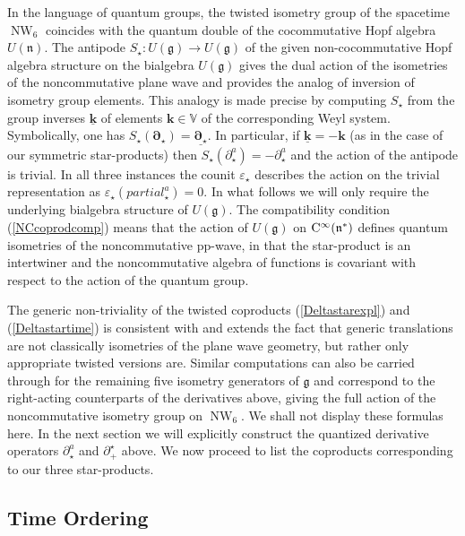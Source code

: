 \documentclass[11pt,a4paper]{article}
\DeclareMathOperator{\NW}{NW}
\newcommand{\1}{\mathbb{1}}
\newcommand{\mbf}[1]{{\boldsymbol {#1} }}
\def\CC{{\rm C}}
\def\mk{{\mbf k}}
\def\mdell{{\mbf\partial}}
\def\mfn{{\mathfrak n}}
\def\mfg{{\mathfrak g}}
\def\mbbV{{\mathbb V}}
\begin{document}
In the language of quantum groups, the twisted isometry group of the
spacetime $\NW_6$ coincides with the quantum double of the
cocommutative Hopf algebra $U(\mfn)$. The antipode
${S}_\star:U(\mfg)\to U(\mfg)$ of the given non-cocommutative Hopf
algebra structure on the bialgebra $U(\mfg)$ gives the dual action of
the isometries of the noncommutative plane wave and provides the
analog of inversion of isometry group elements. This analogy is made
precise by computing ${S}_\star$ from the group inverses
$\underline{\mk}$ of elements $\mk\in\mbbV$ of the corresponding Weyl
system. Symbolically, one has
${S}_\star(\mdell_\star)=\underline{\mdell_\star}$. In particular, if
$\underline{\mk}=-\mk$ (as in the case of our symmetric star-products)
then ${S}_\star(\partial_\star^a)=-\partial_\star^a$ and the action
of the antipode is trivial. In all three instances the counit
$\varepsilon_\star$ describes the action on the trivial representation as
$\varepsilon_\star(partial_\star^a)=0$. In what follows we will only require the
underlying bialgebra structure of $U(\mfg)$. The compatibility
condition (\ref{NCcoprodcomp}) means that the action of $U(\mfg)$ on
$\CC^\infty(\mfn^*)$ defines quantum isometries of the noncommutative
pp-wave, in that the star-product is an intertwiner and the
noncommutative algebra of functions is covariant with respect to the
action of the quantum group.

The generic non-triviality of the twisted coproducts
(\ref{Deltastarexpl}) and (\ref{Deltastartime}) is consistent with and
extends the fact that generic translations are not classically
isometries of the plane wave geometry, but rather only appropriate
twisted versions are. Similar computations can also be carried through
for the remaining five isometry generators of $\mfg$ and correspond to
the right-acting counterparts of the derivatives above, giving the full
action of the noncommutative isometry group on $\NW_6$. We shall not
display these formulas here. In the next section we will explicitly
construct the quantized derivative operators $\partial_\star^a$ and
$\partial_+^\star$ above. We now proceed to list the coproducts
corresponding to our three star-products.

\subsection{Time Ordering \label{TOcoprod}}
\end{document}
